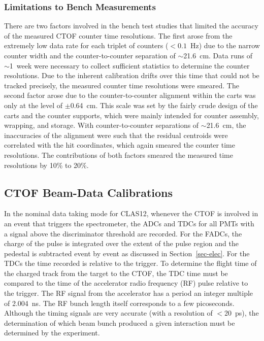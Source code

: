 \documentclass{elsart}
\begin{document}
\subsubsection{Limitations to Bench Measurements}
\label{res-limitations}

There are two factors involved in the bench test studies that limited the accuracy of the measured
CTOF counter time resolutions. The first arose from the extremely low data rate for each triplet 
of counters ($< 0.1$~Hz) due to the narrow counter width and the counter-to-counter separation of 
$\sim$21.6~cm. Data runs of $\sim$1~week were necessary to collect sufficient statistics to 
determine the counter resolutions. Due to the inherent calibration drifts over this time that 
could not be tracked precisely, the measured counter time resolutions were smeared. The second
factor arose due to the counter-to-counter alignment within the carts was only at the level of
$\pm$0.64~cm. This scale was set by the fairly crude design of the carts and the counter supports,
which were mainly intended for counter assembly, wrapping, and storage. With counter-to-counter
separations of $\sim$21.6~cm, the inaccuracies of the alignment were such that the residual centroids
were correlated with the hit coordinates, which again smeared the counter time resolutions. The
contributions of both factors smeared the measured time resolutions by 10\% to 20\%. 

\subsection{CTOF Beam-Data Calibrations}

In the nominal data taking mode for CLAS12, whenever the CTOF is involved in an event that triggers the
spectrometer, the ADCs and TDCs for all PMTs with a signal above the discriminator threshold are recorded.
For the FADCs, the charge of the pulse is integrated over the extent of the pulse region and the pedestal is
subtracted event by event as discussed in Section~\ref{sec-elec}. For the TDCs the time recorded is relative
to the trigger. To determine the flight time of the charged track from the target to the CTOF, the TDC time
must be compared to the time of the accelerator radio frequency (RF) pulse relative to the trigger.  The RF
signal from the accelerator has a period an integer multiple of 2.004~ns. The RF bunch length itself corresponds
to a few picoseconds. Although the timing signals are very accurate (with a resolution of $<$20~ps), the
determination of which beam bunch produced a given interaction must be determined by the experiment.
\end{document}
